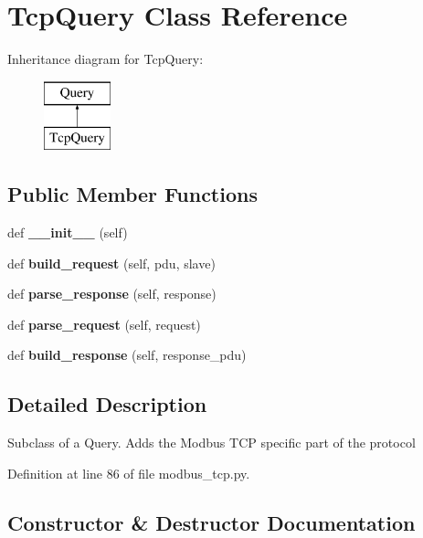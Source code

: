 \section{Tcp\+Query Class Reference}
\label{classprotolibs_1_1modbus__tk_1_1modbus__tcp_1_1_tcp_query}
Inheritance diagram for Tcp\+Query\+:\begin{figure}[H]
\begin{center}
\leavevmode
\includegraphics[height=2.000000cm]{classprotolibs_1_1modbus__tk_1_1modbus__tcp_1_1_tcp_query}
\end{center}
\end{figure}
\subsection*{Public Member Functions}
\begin{DoxyCompactItemize}
\item 
def {\bf \+\_\+\+\_\+init\+\_\+\+\_\+} (self)
\item 
def {\bf build\+\_\+request} (self, pdu, slave)
\item 
def {\bf parse\+\_\+response} (self, response)
\item 
def {\bf parse\+\_\+request} (self, request)
\item 
def {\bf build\+\_\+response} (self, response\+\_\+pdu)
\end{DoxyCompactItemize}


\subsection{Detailed Description}
\begin{DoxyVerb}Subclass of a Query. Adds the Modbus TCP specific part of the protocol\end{DoxyVerb}
 

Definition at line 86 of file modbus\+\_\+tcp.\+py.



\subsection{Constructor \& Destructor Documentation}
